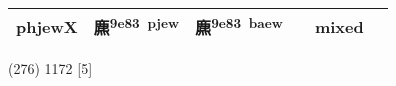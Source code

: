 \documentclass[14pt,a4paper]{scrartcl}
\begin{document}
\begin{longtable}[c]{@{}llllll@{}}
\begin{minipage}[t]{0.14\columnwidth}
phjewX
\strut\end{minipage} &
\begin{minipage}[t]{0.14\columnwidth}\raggedright\strut
麃\textsuperscript{9e83~pjew}
\strut\end{minipage} &
\begin{minipage}[t]{0.14\columnwidth}\raggedright\strut
麃\textsuperscript{9e83~baew}
\strut\end{minipage} &
\begin{minipage}[t]{0.14\columnwidth}\raggedright\strut
\strut\end{minipage} &
\begin{minipage}[t]{0.14\columnwidth}\raggedright\strut
mixed
\strut\end{minipage}\tabularnewline
\bottomrule
\end{longtable}

(276) 1172 {[}5{]}
\end{document}
